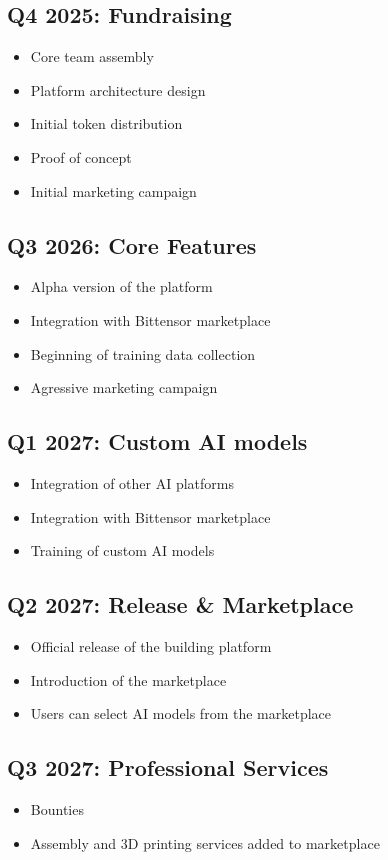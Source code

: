 \subsection{Q4 2025: Fundraising}
\begin{itemize}[leftmargin=*]
    \item Core team assembly
    \item Platform architecture design
    \item Initial token distribution
    \item Proof of concept
    \item Initial marketing campaign
\end{itemize}

\subsection{Q3 2026: Core Features}
\begin{itemize}[leftmargin=*]
    \item Alpha version of the platform
    \item Integration with Bittensor marketplace
    \item Beginning of training data collection
    \item Agressive marketing campaign
\end{itemize}

\subsection{Q1 2027: Custom AI models}
\begin{itemize}[leftmargin=*]
    \item Integration of other AI platforms
    \item Integration with Bittensor marketplace
    \item Training of custom AI models
\end{itemize}

\subsection{Q2 2027: Release & Marketplace}
\begin{itemize}[leftmargin=*]
    \item Official release of the building platform
    \item Introduction of the marketplace
    \item Users can select AI models from the marketplace
\end{itemize}

\subsection{Q3 2027: Professional Services}
\begin{itemize}[leftmargin=*]
    \item Bounties
    \item Assembly and 3D printing services added to marketplace
\end{itemize}
